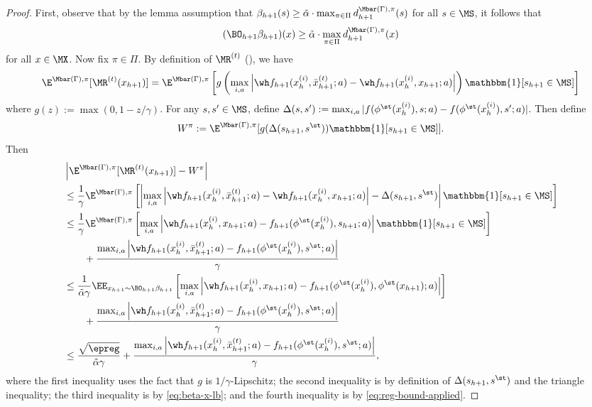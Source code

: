 \begin{proof}
First, observe that by the lemma assumption that $\beta_{h+1}(s) \geq \tilde \alpha \cdot \max_{\pi\in\Pi} d^{\Mbar(\Gamma),\pi}_{h+1}(s)$ for all $s \in \MS$, it follows that 
\begin{equation}
(\BO_{h+1}\beta_{h+1})(x) \geq \tilde \alpha \cdot \max_{\pi\in\Pi} d^{\Mbar(\Gamma),\pi}_{h+1}(x)
\label{eq:beta-x-lb}
\end{equation} 
for all $x \in \MX$. Now fix $\pi \in \Pi$. By definition of $\MR^{(t)}$ (), we have
\[\E^{\Mbar(\Gamma),\pi}[\MR^{(t)}(x_{h+1})] = \E^{\Mbar(\Gamma),\pi}\left[g\left(\max_{i,a}\left|\wh f_{h+1}(x_h^{(i)},\bar x_{h+1}^{(t)};a) - \wh f_{h+1}(x_h^{(i)},x_{h+1};a)\right|\right)\mathbbm{1}[s_{h+1} \in \MS]\right]\]
where $g(z) := \max(0,1-z/\gamma)$. For any $s,s' \in \MS$, define $\Delta(s,s') := \max_{i,a}|f(\phi^\st(x_h^{(i)}),s;a) - f(\phi^\st(x_h^{(i)}),s';a)|$. Then define 
\[W^\pi := \E^{\Mbar(\Gamma),\pi}[g(\Delta(s_{h+1},s^\st))\mathbbm{1}[s_{h+1}\in\MS]].\]
Then
\begin{align}
&\left|\E^{\Mbar(\Gamma),\pi}[\MR^{(t)}(x_{h+1})] - W^\pi\right| \nonumber\\ 
&\leq \frac{1}{\gamma} \E^{\Mbar(\Gamma),\pi}\left[\left|\max_{i,a}\left|\wh f_{h+1}(x_h^{(i)},\bar x_{h+1}^{(t)};a) - \wh f_{h+1}(x_h^{(i)},x_{h+1};a)\right|-\Delta(s_{h+1},s^\st)\right|\mathbbm{1}[s_{h+1}\in\MS]\right] \nonumber\\ 
&\leq \frac{1}{\gamma}\E^{\Mbar(\Gamma),\pi}\left[\max_{i,a}\left|\wh f_{h+1}(x_h^{(i)},x_{h+1};a) - f_{h+1}(\phi^\st(x_h^{(i)}),s_{h+1};a)\right| \mathbbm{1}[s_{h+1}\in\MS]\right] \nonumber\\ 
&\qquad+ \frac{\max_{i,a}\left|\wh f_{h+1}(x_h^{(i)},\bar x^{(t)}_{h+1};a) - f_{h+1}(\phi^\st(x_h^{(i)}),s^\st;a)\right|}{\gamma} \nonumber\\ 
&\leq \frac{1}{\tilde\alpha \gamma}\EE_{x_{h+1} \sim \BO_{h+1}\beta_{h+1}}\left[\max_{i,a}\left|\wh f_{h+1}(x_h^{(i)},x_{h+1};a) - f_{h+1}(\phi^\st(x_h^{(i)}),\phi^\st(x_{h+1});a)\right|\right] \nonumber\\ 
&\qquad+ \frac{\max_{i,a}\left|\wh f_{h+1}(x_h^{(i)},\bar x^{(t)}_{h+1};a) - f_{h+1}(\phi^\st(x_h^{(i)}),s^\st;a)\right|}{\gamma} \nonumber\\ 
&\leq \frac{\sqrt{\epreg}}{\tilde \alpha \gamma} + \frac{\max_{i,a}\left|\wh f_{h+1}(x_h^{(i)},\bar x^{(t)}_{h+1};a) - f_{h+1}(\phi^\st(x_h^{(i)}),s^\st;a)\right|}{\gamma},
\label{eq:rt-w-diff}
\end{align}
where the first inequality uses the fact that $g$ is $1/\gamma$-Lipschitz; the second inequality is by definition of $\Delta(s_{h+1},s^\st)$ and the triangle inequality; the third inequality is by \cref{eq:beta-x-lb}; and the fourth inequality is by \cref{eq:reg-bound-applied}. 


\end{proof}
